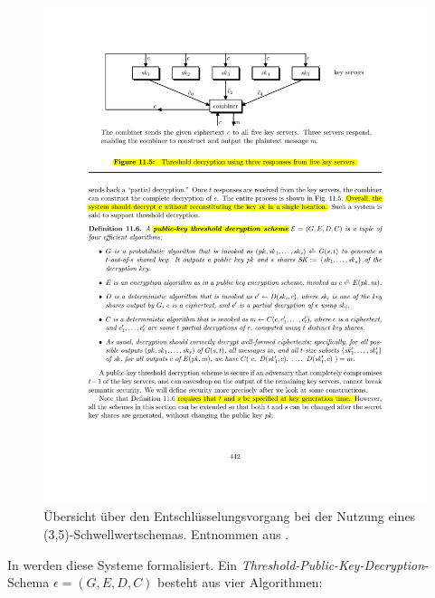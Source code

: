 \begin{figure}[]
    \centering
        \includegraphics[clip, trim=3cm 21.2cm 3cm 2cm, width=1.00\textwidth]{img/threshold_decryption_excerpt.pdf}
    \caption{Übersicht über den Entschlüsselungsvorgang bei der Nutzung eines (3,5)-Schwellwertschemas. Entnommen aus \cite{boneh2016}.}
    \label{fig:threshold_decryption_combiner}
\end{figure}

In \cite{boneh2016} werden diese Systeme formalisiert. Ein \textit{Threshold-Public-Key-Decryption}-Schema \(\epsilon = (G, E, D, C)\) besteht aus vier Algorithmen: 

